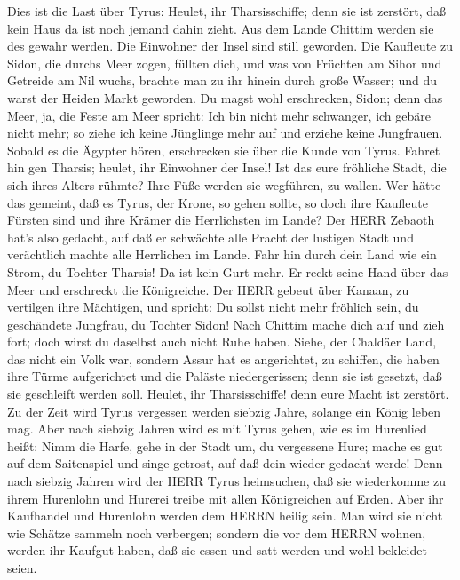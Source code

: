  Dies ist die Last über Tyrus: Heulet, ihr Tharsisschiffe;
denn sie ist zerstört, daß kein Haus da ist noch jemand dahin zieht. Aus
dem Lande Chittim werden sie des gewahr werden.  Die
Einwohner der Insel sind still geworden. Die Kaufleute zu Sidon, die
durchs Meer zogen, füllten dich,  und was von Früchten am
Sihor und Getreide am Nil wuchs, brachte man zu ihr hinein durch große
Wasser; und du warst der Heiden Markt geworden.  Du magst
wohl erschrecken, Sidon; denn das Meer, ja, die Feste am Meer spricht:
Ich bin nicht mehr schwanger, ich gebäre nicht mehr; so ziehe ich keine
Jünglinge mehr auf und erziehe keine Jungfrauen.  Sobald es
die Ägypter hören, erschrecken sie über die Kunde von Tyrus.
 Fahret hin gen Tharsis; heulet, ihr Einwohner der Insel!
 Ist das eure fröhliche Stadt, die sich ihres Alters rühmte?
Ihre Füße werden sie wegführen, zu wallen.  Wer hätte das
gemeint, daß es Tyrus, der Krone, so gehen sollte, so doch ihre
Kaufleute Fürsten sind und ihre Krämer die Herrlichsten im Lande?
 Der HERR Zebaoth hat's also gedacht, auf daß er schwächte
alle Pracht der lustigen Stadt und verächtlich machte alle Herrlichen im
Lande.  Fahr hin durch dein Land wie ein Strom, du Tochter
Tharsis! Da ist kein Gurt mehr.  Er reckt seine Hand über
das Meer und erschreckt die Königreiche. Der HERR gebeut über Kanaan, zu
vertilgen ihre Mächtigen,  und spricht: Du sollst nicht
mehr fröhlich sein, du geschändete Jungfrau, du Tochter Sidon! Nach
Chittim mache dich auf und zieh fort; doch wirst du daselbst auch nicht
Ruhe haben.  Siehe, der Chaldäer Land, das nicht ein Volk
war, sondern Assur hat es angerichtet, zu schiffen, die haben ihre Türme
aufgerichtet und die Paläste niedergerissen; denn sie ist gesetzt, daß
sie geschleift werden soll.  Heulet, ihr Tharsisschiffe!
denn eure Macht ist zerstört.  Zu der Zeit wird Tyrus
vergessen werden siebzig Jahre, solange ein König leben mag. Aber nach
siebzig Jahren wird es mit Tyrus gehen, wie es im Hurenlied heißt:
 Nimm die Harfe, gehe in der Stadt um, du vergessene Hure;
mache es gut auf dem Saitenspiel und singe getrost, auf daß dein wieder
gedacht werde!  Denn nach siebzig Jahren wird der HERR
Tyrus heimsuchen, daß sie wiederkomme zu ihrem Hurenlohn und Hurerei
treibe mit allen Königreichen auf Erden.  Aber ihr
Kaufhandel und Hurenlohn werden dem HERRN heilig sein. Man wird sie
nicht wie Schätze sammeln noch verbergen; sondern die vor dem HERRN
wohnen, werden ihr Kaufgut haben, daß sie essen und satt werden und wohl
bekleidet seien.

